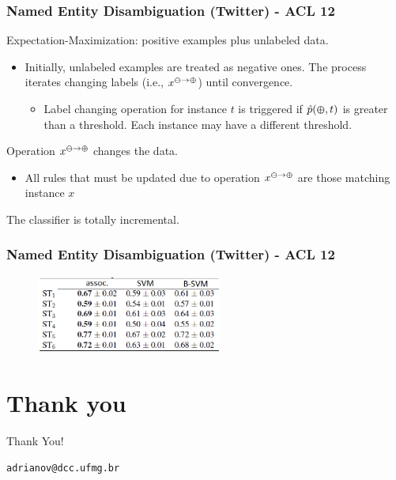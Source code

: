 \documentclass{beamer}
\begin{document}
\begin{frame}\frametitle{Named Entity Disambiguation (Twitter) - ACL 12}

Expectation-Maximization: positive examples plus unlabeled data.

\begin{itemize}
\item Initially, unlabeled examples are treated as negative ones. The process iterates changing labels (i.e., $x^{\varominus\to\varoplus}$) until convergence.
\begin{itemize}
\item Label changing operation for instance $t$ is triggered if $\hat{p}(\varoplus, t)$ is greater than a threshold. Each instance may have a different threshold.
\end{itemize}
\end{itemize}


Operation $x^{\varominus\to\varoplus}$ changes the data.

\begin{itemize}
\item 
All rules that must be updated
due to operation $x^{\varominus\to\varoplus}$ are those matching instance $x$
\end{itemize}

\alert{The classifier is totally incremental.}

\end{frame}

\begin{frame}\frametitle{Named Entity Disambiguation (Twitter) - ACL 12}

\begin{figure}
\centering
\includegraphics[height=1.00in]{disam.eps}
\end{figure}

\end{frame}

\section{Thank you}
\begin{frame}{Thank You!}
\begin{center}
\tt adrianov@dcc.ufmg.br\\
\end{center}
\end{frame}
\end{document}

